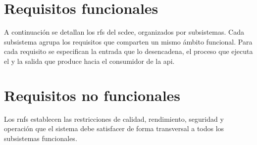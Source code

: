 \section{Requisitos funcionales}
\label{sec:rf}

A continuación se detallan los \acsp{rf} del \acs{scdee}, organizados por subsistemas.
Cada subsistema agrupa los requisitos que comparten un mismo ámbito funcional. Para cada
requisito se especifican la entrada que lo desencadena, el proceso que ejecuta el
 y la salida que produce hacia el consumidor de la \acs{api}.

\begin{functional}
    
    
    
    
    
    
    
    
    
    
    
    
    
    
    
    
\end{functional}

\section{Requisitos no funcionales}
\label{sec:rnf}

Los \acsp{rnf} establecen las restricciones de calidad, rendimiento, seguridad y operación
que el sistema debe satisfacer de forma transversal a todos los subsistemas funcionales.

\begin{nonfunctional}
    
\end{nonfunctional}
